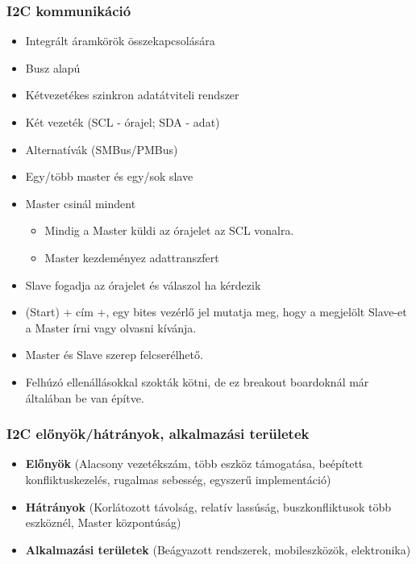 \subsubsection{I2C kommunikáció}
\begin{itemize}
    \item Integrált áramkörök összekapcsolására
    \item Busz alapú
    \item Kétvezetékes szinkron adatátviteli rendszer
    \item Két vezeték (SCL - órajel; SDA - adat)
    \item Alternatívák (SMBus/PMBus)
    \item Egy/több master és egy/sok slave
    \item Master csinál mindent
    \begin{itemize}
        \item Mindig a Master küldi az órajelet az SCL vonalra.
        \item Master kezdeményez adattranszfert
    \end{itemize}
    \item Slave fogadja az órajelet és válaszol ha kérdezik
    \item (Start) + cím +, egy bites vezérlő jel mutatja meg, hogy a megjelölt Slave-et a Master írni vagy olvasni kívánja.
    \item Master és Slave szerep felcserélhető.
    \item Felhúzó ellenállásokkal szokták kötni, de ez breakout boardoknál már általában be van építve.
\end{itemize}

\subsubsection{I2C előnyök/hátrányok, alkalmazási területek}
\begin{itemize}
    \item \textbf{Előnyök} (Alacsony vezetékszám, több eszköz támogatása, beépített konfliktuskezelés, rugalmas sebesség, egyszerű implementáció)
    \item \textbf{Hátrányok} (Korlátozott távolság, relatív lassúság, buszkonfliktusok több eszköznél, Master központúság)
    \item \textbf{Alkalmazási területek} (Beágyazott rendszerek, mobileszközök, elektronika)
\end{itemize}

